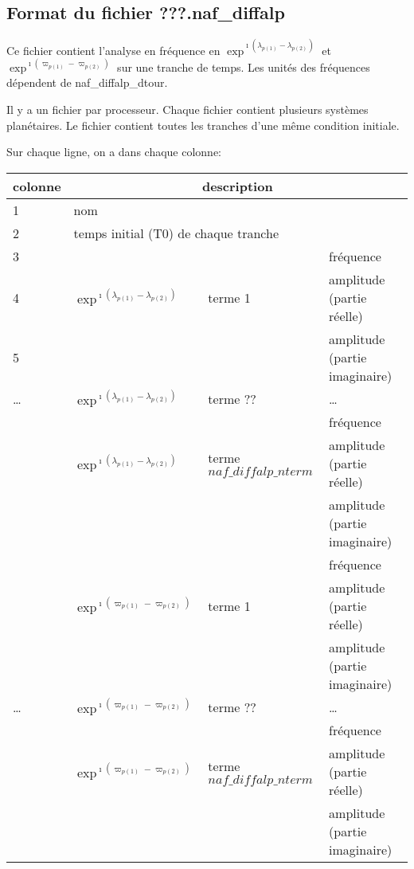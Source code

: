 \documentclass[11pt]{article}
\begin{document}
\subsection{Format du fichier {\bf ???.naf\_diffalp} }

Ce fichier contient l'analyse en fr\'equence en  $\exp^{\imath(\lambda_{p(1)}-\lambda_{p(2)})}$ et $\exp^{\imath(\varpi_{p(1)}-\varpi_{p(2)})}$ sur une tranche de temps. Les unit\'es des fr\'equences d\'ependent de naf\_diffalp\_dtour.

 Il y a un fichier par processeur. Chaque fichier contient plusieurs syst\`emes plan\'etaires. Le fichier contient toutes les tranches d'une m\^eme  condition initiale.


Sur chaque ligne, on a dans chaque colonne: 

\begin{tabularx}{\textwidth}{|l|l|l|X|}
 \hline
 colonne &      \multicolumn{3}{c|}{description} \\ \hline
1  &    \multicolumn{3}{l|}{nom} \\ \hline
2  &    \multicolumn{3}{l|}{temps initial (T0) de chaque tranche} \\ \hline
3 & &    & fr\'equence\\
4 &$\exp^{\imath(\lambda_{p(1)}-\lambda_{p(2)})}$& terme 1 & amplitude (partie r\'eelle)\\
5 &   & &amplitude (partie imaginaire)\\ \hline
\dots &  $\exp^{\imath(\lambda_{p(1)}-\lambda_{p(2)})}$& terme ?? &\dots \\ \hline
 & &    &fr\'equence\\
 &  $\exp^{\imath(\lambda_{p(1)}-\lambda_{p(2)})}$ & terme $naf\_diffalp\_nterm$ & amplitude (partie r\'eelle)\\
 & &    &amplitude (partie imaginaire)\\ \hline
 & &   & fr\'equence\\
 &$\exp^{\imath(\varpi_{p(1)}-\varpi_{p(2)})}$& terme 1 & amplitude (partie r\'eelle)\\
 &    & &amplitude (partie imaginaire)\\ \hline
\dots & $\exp^{\imath(\varpi_{p(1)}-\varpi_{p(2)})}$& terme ?? &\dots \\ \hline
 & &    &fr\'equence\\
 & $\exp^{\imath(\varpi_{p(1)}-\varpi_{p(2)})}$ & terme $naf\_diffalp\_nterm$ & amplitude (partie r\'eelle)\\
 &   & &amplitude (partie imaginaire)\\ \hline
\end{tabularx}
\end{document}
